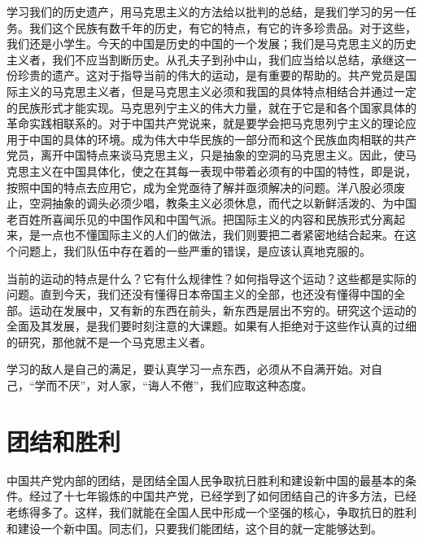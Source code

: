 学习我们的历史遗产，用马克思主义的方法给以批判的总结，是我们学习的另一任务。我们这个民族有数千年的历史，有它的特点，有它的许多珍贵品。对于这些，我们还是小学生。今天的中国是历史的中国的一个发展；我们是马克思主义的历史主义者，我们不应当割断历史。从孔夫子到孙中山，我们应当给以总结，承继这一份珍贵的遗产。这对于指导当前的伟大的运动，是有重要的帮助的。共产党员是国际主义的马克思主义者，但是马克思主义必须和我国的具体特点相结合并通过一定的民族形式才能实现。马克思列宁主义的伟大力量，就在于它是和各个国家具体的革命实践相联系的。对于中国共产党说来，就是要学会把马克思列宁主义的理论应用于中国的具体的环境。成为伟大中华民族的一部分而和这个民族血肉相联的共产党员，离开中国特点来谈马克思主义，只是抽象的空洞的马克思主义。因此，使马克思主义在中国具体化，使之在其每一表现中带着必须有的中国的特性，即是说，按照中国的特点去应用它，成为全党亟待了解并亟须解决的问题。洋八股必须废止，空洞抽象的调头必须少唱，教条主义必须休息，而代之以新鲜活泼的、为中国老百姓所喜闻乐见的中国作风和中国气派。把国际主义的内容和民族形式分离起来，是一点也不懂国际主义的人们的做法，我们则要把二者紧密地结合起来。在这个问题上，我们队伍中存在着的一些严重的错误，是应该认真地克服的。

当前的运动的特点是什么？它有什么规律性？如何指导这个运动？这些都是实际的问题。直到今天，我们还没有懂得日本帝国主义的全部，也还没有懂得中国的全部。运动在发展中，又有新的东西在前头，新东西是层出不穷的。研究这个运动的全面及其发展，是我们要时刻注意的大课题。如果有人拒绝对于这些作认真的过细的研究，那他就不是一个马克思主义者。

学习的敌人是自己的满足，要认真学习一点东西，必须从不自满开始。对自己，“学而不厌”，对人家，“诲人不倦”，我们应取这种态度。

\section{团结和胜利}

中国共产党内部的团结，是团结全国人民争取抗日胜利和建设新中国的最基本的条件。经过了十七年锻炼的中国共产党，已经学到了如何团结自己的许多方法，已经老练得多了。这样，我们就能在全国人民中形成一个坚强的核心，争取抗日的胜利和建设一个新中国。同志们，只要我们能团结，这个目的就一定能够达到。


